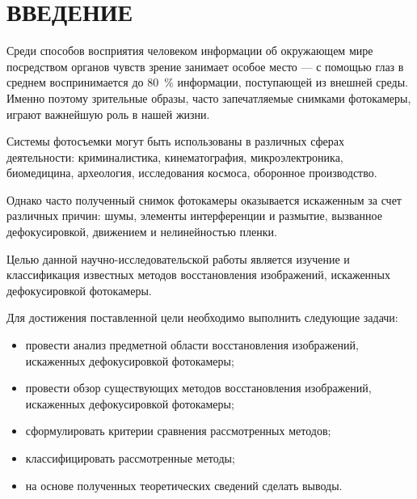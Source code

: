 \chapter*{ВВЕДЕНИЕ}

Среди способов восприятия человеком информации об окружающем мире посредством органов чувств зрение занимает особое место --- с помощью глаз в среднем воспринимается до 80~\% информации, поступающей из внешней среды.~\cite{percent} Именно поэтому зрительные образы, часто запечатляемые снимками фотокамеры, играют важнейшую роль в нашей жизни. 

Системы фотосъемки могут быть использованы в различных сферах деятельности: криминалистика, кинематография, микроэлектроника, биомедицина, археология, исследования космоса, оборонное производство.~\cite{spheres}

Однако часто полученный снимок фотокамеры оказывается искаженным за счет различных причин: шумы, элементы интерференции и размытие, вызванное дефокусировкой, движением и нелинейностью пленки.~\cite{damage}

Целью данной научно-исследовательской работы является изучение и классификация известных методов восстановления изображений, искаженных дефокусировкой фотокамеры.

Для достижения поставленной цели необходимо выполнить следующие задачи:

\begin{itemize}
	\item провести анализ предметной области восстановления изображений, искаженных дефокусировкой фотокамеры;
	\item провести обзор существующих методов восстановления изображений, искаженных дефокусировкой фотокамеры;
	\item сформулировать критерии сравнения рассмотренных методов;
	\item классифицировать рассмотренные методы;
	\item на основе полученных теоретических сведений сделать выводы.
\end{itemize}